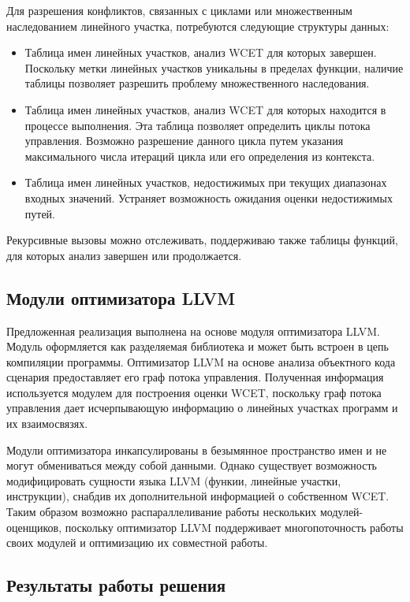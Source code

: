\documentclass[12pt,a4paper]{article}
\begin{document}
Для разрешения конфликтов, связанных с циклами или множественным наследованием линейного участка, потребуются следующие структуры данных:

\begin{itemize}
\item Таблица имен линейных участков, анализ WCET для которых завершен. Поскольку метки линейных участков уникальны в пределах функции, наличие таблицы позволяет разрешить проблему множественного наследования.
\item Таблица имен линейных участков, анализ WCET для которых находится в процессе выполнения. Эта таблица позволяет определить циклы потока управления. Возможно разрешение данного цикла путем указания максимального числа итераций цикла или его определения из контекста.
\item Таблица имен линейных участков, недостижимых при текущих диапазонах входных значений. Устраняет возможность ожидания оценки недостижимых путей. 
\end{itemize}

Рекурсивные вызовы можно отслеживать, поддерживаю также таблицы функций, для которых анализ завершен или продолжается.

\subsection{Модули оптимизатора LLVM}
Предложенная реализация выполнена на основе модуля оптимизатора LLVM. Модуль оформляется как разделяемая библиотека и может быть встроен в цепь компиляции программы. Оптимизатор LLVM на основе анализа объектного кода сценария предоставляет его граф потока управления. Полученная информация используется модулем для построения оценки WCET, поскольку граф потока управления дает исчерпывающую информацию о линейных участках программ и их взаимосвязях.

Модули оптимизатора инкапсулированы в безымянное пространство имен и не могут обмениваться между собой данными. Однако существует возможность модифицировать сущности языка LLVM (функии, линейные участки, инструкции), снабдив их дополнительной информацией о собственном WCET. Таким образом возможно распараллеливание работы нескольких модулей-оценщиков, поскольку оптимизатор LLVM поддерживает многопоточность работы своих модулей и оптимизацию их совместной работы.
	
\subsection{Результаты работы решения}
\end{document}
